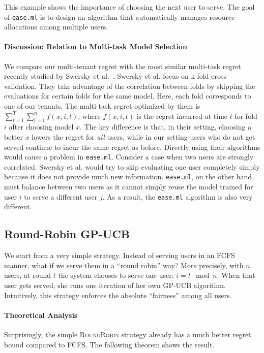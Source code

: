 \documentclass[letterpaper]{vldb}
\newcommand{\eml}{\texttt{ease.ml}\xspace}
\newcommand{\rr}{\textsc{RoundRobin}\xspace}
\begin{document}
\vspace{0.5em}
This example shows the importance of
choosing the next user to serve. The goal of
\eml is to design an algorithm
that automatically manages resource
allocations among multiple users.

\vspace{-0.5em}
\paragraph*{Discussion: Relation to 
Multi-task Model Selection}
We compare our multi-tenant
regret with the most similar multi-task
regret recently
studied by Swersky et al.~\cite{Swersky2013}.
Swersky et al. focus on 
k-fold cross validation. They 
take advantage of the correlation between
folds by skipping the evaluations for certain folds for the same model. Here, each fold corresponds to 
one of our tenants. The
multi-task regret optimized by them
is $\sum_{t=1}^T \sum_{i=1}^n f(x, i, t)$,
where $f(x, i, t)$ is the regret incurred
at time $t$ for fold $i$ after choosing
model $x$. The key difference
is that, in their setting, choosing a
better $x$ lowers the regret for {\em all}
users, while in our setting users
who do not get served continue to incur 
the same regret as before. 
Directly using their algorithms would 
cause a problem in \eml. Consider
a case when two users are strongly correlated. Swersky et al. would try to 
skip evaluating one user completely
simply because it does not provide much new information. \eml, on the other hand, must 
balance between two users as it cannot 
simply reuse the model trained 
for user $i$ to serve a different user $j$.
As a result, the \eml algorithm is also very different.

\subsection{Round-Robin GP-UCB}

We start from a very simple strategy. Instead of
serving users in an FCFS manner, what if
we serve them in a ``round robin'' way?
More precisely, with $n$ users, 
at round $t$ the system
chooses to serve one user: $i = t \mod n$.
When that user gets served, she runs one
iteration of her own GP-UCB algorithm. 
Intuitively, this strategy enforces
the absolute ``fairness'' among all users.

\vspace{-0.5em}
\paragraph*{Theoretical Analysis}
Surprisingly, the simple \rr strategy already
has a much better regret bound compared
to FCFS. The following theorem shows
the result. 
\end{document}

